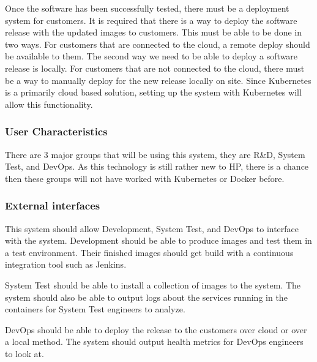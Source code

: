 \documentclass[onecolumn, draftclsnofoot,10pt, compsoc]{IEEEtran}
\begin{document}
Once the software has been successfully tested, there must be a deployment system for customers. 
It is required that there is a way to deploy the software release with the updated images to customers. 
This must be able to be done in two ways. 
For customers that are connected to the cloud, a remote deploy should be available to them. 
The second way we need to be able to deploy a software release is locally. 
For customers that are not connected to the cloud, there must be a way to manually deploy for the new release locally on site. 
Since Kubernetes is a primarily cloud based solution, setting up the system with Kubernetes will allow this functionality. 



\subsubsection{User Characteristics}

There are 3 major groups that will be using this system, they are R\&D, System Test, and DevOps. 
As this technology is still rather new to HP, there is a chance then these groups will not have worked with Kubernetes or Docker before.

\subsubsection{External interfaces}

This system should allow Development, System Test, and DevOps to interface with the system. Development should be able to produce images and test them in a test environment. Their finished images should get build with a continuous integration tool such as Jenkins. 

System Test should be able to install a collection of images to the system. The system should also be able to output logs about the services running in the containers for System Test engineers to analyze. 

DevOps should be able to deploy the release to the customers over cloud or over a local method. The system should output health metrics for DevOps engineers to look at. 
\end{document}
